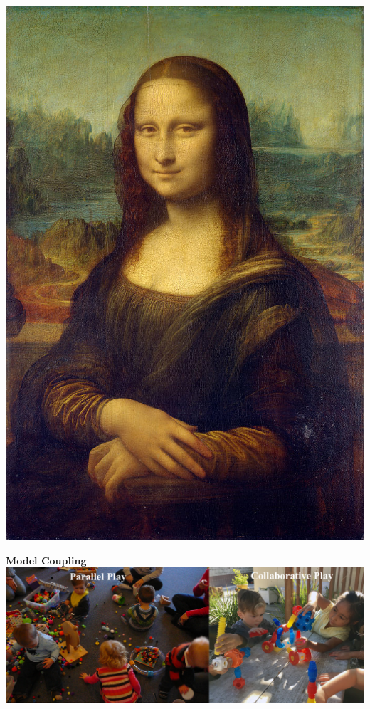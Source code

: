 \documentclass{beamer}
\begin{document}
\begin{frame}[c]
\begin{center}
\hspace*{-0.5cm}\includegraphics[scale=1.0]{MonaLisaOrig.png}
\end{center}
\end{frame}

\begin{frame}[c]
\begin{center}
\textbf{\huge \color{AlertColor} Model Coupling}
\hspace*{-0.5cm}\includegraphics[scale=0.16]{play.png}
\end{center}
\end{frame}
\end{document}
